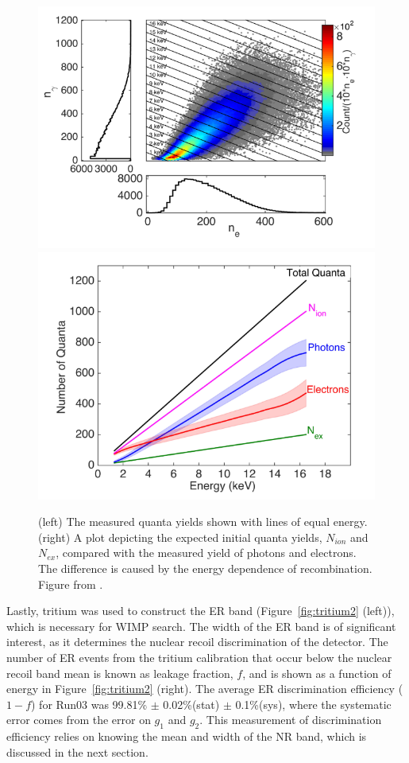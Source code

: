 \begin{figure}[htbp]
\begin{center}
\includegraphics[width=\halffig]{figures/lux/lux_tritium3a.png}
\includegraphics[width=\halffig]{figures/lux/lux_tritium3b.png}
\caption{ (left) The measured quanta yields shown with lines of equal energy. (right) A plot depicting the expected initial quanta yields, $N_{ion}$ and $N_{ex}$, compared with the measured yield of photons and electrons. The difference is caused by the energy dependence of recombination. Figure from \cite{LUXTritium}.}
\label{fig:tritium3}
\end{center}
\end{figure}

Lastly, tritium was used to construct the \ac{ER} band (Figure~\ref{fig:tritium2} (left)), which is necessary for \ac{WIMP} search. The width of the \ac{ER} band is of significant interest, as it determines the nuclear recoil discrimination of the detector. The number of \ac{ER} events from the tritium calibration that occur below the nuclear recoil band mean is known as leakage fraction, $f$, and is shown as a function of energy in Figure~\ref{fig:tritium2} (right). The average \ac{ER} discrimination efficiency ($1-f$) for Run03 was 99.81\% $\pm$ 0.02\%(stat) $\pm$ 0.1\%(sys), where the systematic error comes from the error on $g_{1}$ and $g_{2}$. This measurement of discrimination efficiency relies on knowing the mean and width of the \ac{NR} band, which is discussed in the next section.

